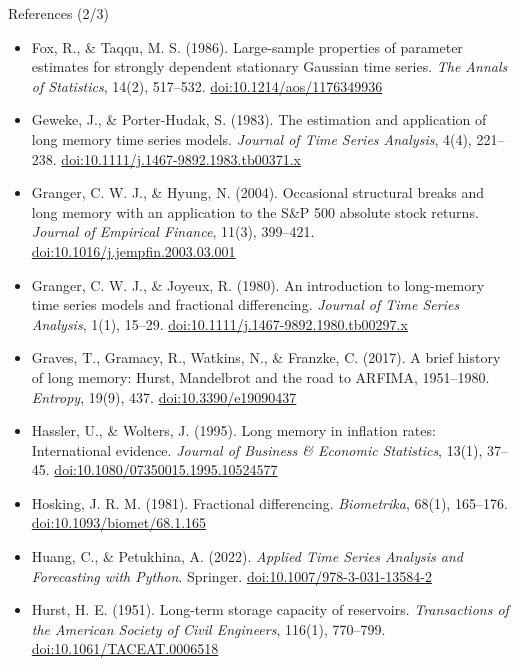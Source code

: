 \begin{frame}{References (2/3)}
\itemsize{\scriptsize}
\begin{itemize}
    \item Fox, R., \& Taqqu, M. S. (1986). Large-sample properties of parameter estimates for strongly dependent stationary Gaussian time series. \textit{The Annals of Statistics}, 14(2), 517--532. \href{https://doi.org/10.1214/aos/1176349936}{doi:10.1214/aos/1176349936}
    \item Geweke, J., \& Porter-Hudak, S. (1983). The estimation and application of long memory time series models. \textit{Journal of Time Series Analysis}, 4(4), 221--238. \href{https://doi.org/10.1111/j.1467-9892.1983.tb00371.x}{doi:10.1111/j.1467-9892.1983.tb00371.x}
    \item Granger, C. W. J., \& Hyung, N. (2004). Occasional structural breaks and long memory with an application to the S\&P 500 absolute stock returns. \textit{Journal of Empirical Finance}, 11(3), 399--421. \href{https://doi.org/10.1016/j.jempfin.2003.03.001}{doi:10.1016/j.jempfin.2003.03.001}
    \item Granger, C. W. J., \& Joyeux, R. (1980). An introduction to long-memory time series models and fractional differencing. \textit{Journal of Time Series Analysis}, 1(1), 15--29. \href{https://doi.org/10.1111/j.1467-9892.1980.tb00297.x}{doi:10.1111/j.1467-9892.1980.tb00297.x}
    \item Graves, T., Gramacy, R., Watkins, N., \& Franzke, C. (2017). A brief history of long memory: Hurst, Mandelbrot and the road to ARFIMA, 1951--1980. \textit{Entropy}, 19(9), 437. \href{https://doi.org/10.3390/e19090437}{doi:10.3390/e19090437}
    \item Hassler, U., \& Wolters, J. (1995). Long memory in inflation rates: International evidence. \textit{Journal of Business \& Economic Statistics}, 13(1), 37--45. \href{https://doi.org/10.1080/07350015.1995.10524577}{doi:10.1080/07350015.1995.10524577}
    \item Hosking, J. R. M. (1981). Fractional differencing. \textit{Biometrika}, 68(1), 165--176. \href{https://doi.org/10.1093/biomet/68.1.165}{doi:10.1093/biomet/68.1.165}
    \item Huang, C., \& Petukhina, A. (2022). \textit{Applied Time Series Analysis and Forecasting with Python}. Springer. \href{https://doi.org/10.1007/978-3-031-13584-2}{doi:10.1007/978-3-031-13584-2}
    \item Hurst, H. E. (1951). Long-term storage capacity of reservoirs. \textit{Transactions of the American Society of Civil Engineers}, 116(1), 770--799. \href{https://doi.org/10.1061/TACEAT.0006518}{doi:10.1061/TACEAT.0006518}
\end{itemize}
\end{frame}

